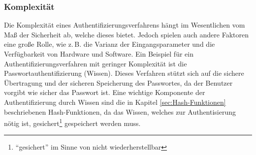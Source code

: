 \documentclass[11pt,a4paper,ngerman]{scrreprt}
\begin{document}
\subsubsection{Komplexität}
Die Komplexität eines Authentifizierungsverfahrens hängt im Wesentlichen vom Maß der Sicherheit ab, welche dieses bietet. Jedoch spielen auch andere Faktoren eine große Rolle, wie z.\,B. die Varianz der Eingangsparameter und die Verfügbarkeit von Hardware und Software. Ein Beispiel für ein Authentifizierungsverfahren mit geringer Komplexität ist die Passwortauthentifizierung (Wissen). Dieses Verfahren stützt sich auf die sichere Übertragung und der sicheren Speicherung des Passwortes, da der Benutzer vorgibt wie sicher das Passwort ist. Eine wichtige Komponente der Authentifizierung durch Wissen sind die in Kapitel \ref{sec:Hash-Funktionen} beschriebenen Hash-Funktionen, da das Wissen, welches zur Authentisierung nötig ist, gesichert\footnote{``gesichert'' im Sinne von nicht wiederherstellbar} gespeichert werden muss.
\end{document}
